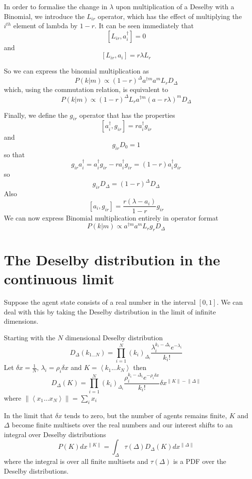 \documentclass[letterpaper,twocolumn,10pt]{article}
\begin{document}
In order to formalise the change in $\lambda$ upon multiplication of a Deselby with a Binomial, we introduce the $L_{ir}$ operator, which has the effect of multiplying the $i^{th}$ element of lambda by $1-r$. It can be seen immediately that
\[
[L_{ir},a_i^\dag] = 0
\]
and
\[
[L_{ir}, a_i] = r\lambda L_r
\]

So we can express the binomial multiplication as
\begin{equation}
P(k|m) \propto (1-r)^\Delta a^{\dag m}a^mL_r D_{\Delta}
\end{equation}
which, using the commutation relation, is equivalent to
\begin{equation}
P(k|m) \propto (1-r)^\Delta L_r a^{\dag m}(a - r\lambda)^m D_{\Delta}
\end{equation}

Finally, we define the $g_{ir}$ operator that has the properties
\[
[a_i^\dag, g_{ir}] = ra_i^\dag g_{ir}
\]
and
\[
g_{ir}D_0 = 1
\]
so that
\[
g_{ir}a_i^\dag = a_i^\dag g_{ir} - ra_i^\dag g_{ir} = (1-r)a_i^\dag g_{ir}
\]
so
\[
g_{ir}D_\Delta = (1-r)^\Delta D_\Delta
\]
Also
\[
[a_i, g_{ir}] = \frac{r(\lambda - a_i)}{1-r}g_{ir}
\]
We can now express Binomial multiplication entirely in operator format
\begin{equation}
P(k|m) \propto a^{\dag m}a^m L_r g_r D_{\Delta}
\end{equation}

\section{The Deselby distribution in the continuous limit}

Suppose the agent state consists of a real number in the interval $[0,1]$. We can deal with this by taking the Deselby distribution in the limit of infinite dimensions.

Starting with the $N$ dimensional Deselby distribution
\[
D_\Delta(k_{1...N}) = \prod_{i=1}^N (k_i)_{\Delta_i}\frac{\lambda_i^{k_i-\Delta_i}e^{-\lambda_i}}{k_i!}
\]
Let $\delta x = \frac{1}{N}$, $\lambda_i = \rho_i \delta x$  and $K = \left< k_1...k_N \right>$ then
\begin{equation}
D_\Delta(K) = \prod_{i=1}^N (k_i)_{\Delta_i}\frac{\rho_i^{k_i-\Delta_i}e^{-\rho_i \delta x}}{k_i!} \delta x^{\lVert K\rVert - \lVert \Delta \rVert}
\label{continuousDeselby}
\end{equation}
where $\lVert \left<x_1...x_N \right> \rVert = \sum_i x_i$

In the limit that $\delta x$ tends to zero, but the number of agents remains finite, $K$ and $\Delta$ become finite multisets over the real numbers and our interest shifts to an integral over Deselby distributions
\[
P(K) dx^{\lVert K \rVert} = \int_\Delta \tau(\Delta) D_\Delta(K) dx^{\lVert\Delta \rVert}
\]
where the integral is over all finite multisets and $\tau(\Delta)$ is a PDF over the Deselby distributions.
\end{document}
